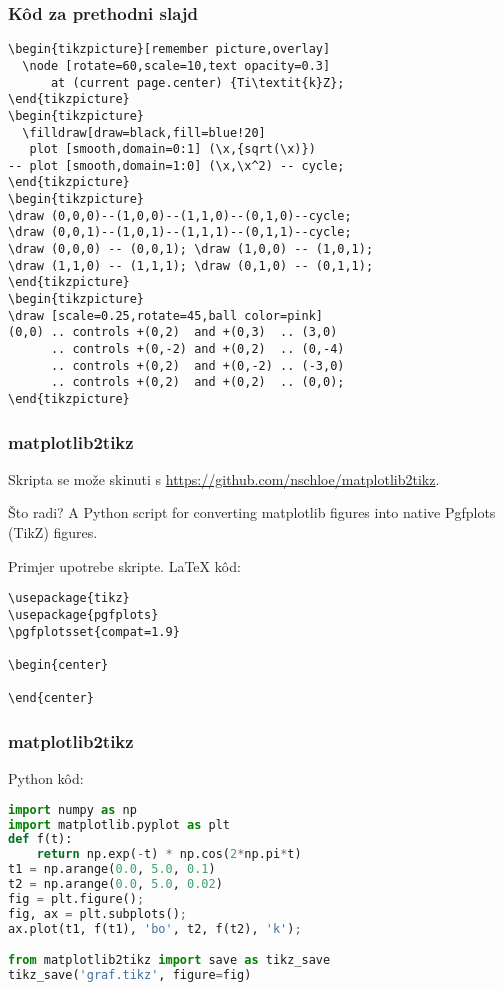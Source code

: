 \documentclass{beamer}
\begin{document}
\begin{frame}[fragile]
\frametitle{K\^od za prethodni slajd}
\scriptsize
\begin{lstlisting}
\begin{tikzpicture}[remember picture,overlay]
  \node [rotate=60,scale=10,text opacity=0.3]
      at (current page.center) {Ti\textit{k}Z};
\end{tikzpicture}
\begin{tikzpicture}
  \filldraw[draw=black,fill=blue!20]
   plot [smooth,domain=0:1] (\x,{sqrt(\x)})
-- plot [smooth,domain=1:0] (\x,\x^2) -- cycle; 
\end{tikzpicture} 
\begin{tikzpicture}
\draw (0,0,0)--(1,0,0)--(1,1,0)--(0,1,0)--cycle;
\draw (0,0,1)--(1,0,1)--(1,1,1)--(0,1,1)--cycle; 
\draw (0,0,0) -- (0,0,1); \draw (1,0,0) -- (1,0,1); 
\draw (1,1,0) -- (1,1,1); \draw (0,1,0) -- (0,1,1); 
\end{tikzpicture}
\begin{tikzpicture}
\draw [scale=0.25,rotate=45,ball color=pink]
(0,0) .. controls +(0,2)  and +(0,3)  .. (3,0)
      .. controls +(0,-2) and +(0,2)  .. (0,-4)
      .. controls +(0,2)  and +(0,-2) .. (-3,0)
      .. controls +(0,2)  and +(0,2)  .. (0,0);  
\end{tikzpicture} 
\end{lstlisting}     
\end{frame}

\begin{frame}[fragile]
\frametitle{matplotlib2tikz}
Skripta se može skinuti s \url{https://github.com/nschloe/matplotlib2tikz}.
\begin{block}{Što radi?}
A Python script for converting matplotlib figures into native Pgfplots (TikZ) figures.    
\end{block}    
Primjer upotrebe skripte.
\LaTeX{} k\^od:
\begin{lstlisting}
\usepackage{tikz}
\usepackage{pgfplots}
\pgfplotsset{compat=1.9}

\begin{center}

\end{center}  
\end{lstlisting}
\end{frame}

\begin{frame}[fragile]
\frametitle{matplotlib2tikz}
Python k\^od:
\begin{lstlisting}[language=Python]
import numpy as np
import matplotlib.pyplot as plt
def f(t):
    return np.exp(-t) * np.cos(2*np.pi*t)
t1 = np.arange(0.0, 5.0, 0.1)
t2 = np.arange(0.0, 5.0, 0.02)
fig = plt.figure();
fig, ax = plt.subplots();
ax.plot(t1, f(t1), 'bo', t2, f(t2), 'k'); 

from matplotlib2tikz import save as tikz_save
tikz_save('graf.tikz', figure=fig)
\end{lstlisting}

\end{frame}
\end{document}

